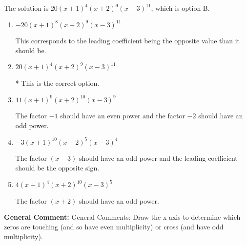 \documentclass{extbook}[14pt]
\begin{document}
\begin{enumerate}
{The solution is \( 20(x + 1)^{4} (x + 2)^{9} (x - 3)^{11} \), which is option B.\begin{enumerate}[label=\Alph*.]
\item \( -20(x + 1)^{8} (x + 2)^{9} (x - 3)^{11} \)

This corresponds to the leading coefficient being the opposite value than it should be.
\item \( 20(x + 1)^{4} (x + 2)^{9} (x - 3)^{11} \)

* This is the correct option.
\item \( 11(x + 1)^{9} (x + 2)^{10} (x - 3)^{9} \)

The factor $-1$ should have an even power and the factor $-2$ should have an odd power.
\item \( -3(x + 1)^{10} (x + 2)^{5} (x - 3)^{4} \)

The factor $(x - 3)$ should have an odd power and the leading coefficient should be the opposite sign.
\item \( 4(x + 1)^{4} (x + 2)^{10} (x - 3)^{5} \)

The factor $(x + 2)$ should have an odd power.
\end{enumerate}

\textbf{General Comment:} General Comments: Draw the x-axis to determine which zeros are touching (and so have even multiplicity) or cross (and have odd multiplicity).
}
\end{enumerate}
\end{document}
